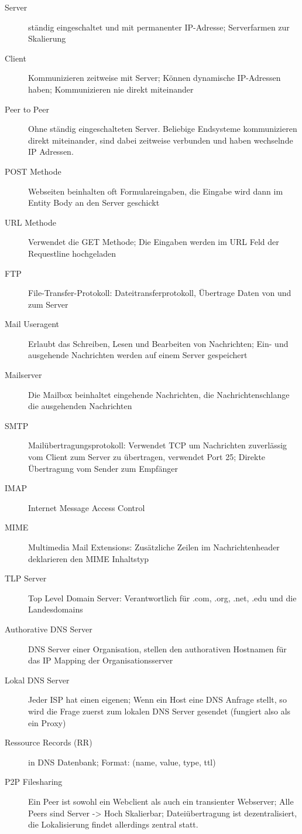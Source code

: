 \documentclass[10pt,landscape]{article}
\begin{document}
\begin{multicols}{3}
\begin{description}
    \item[Server] ständig eingeschaltet und mit permanenter IP-Adresse; Serverfarmen zur Skalierung
    \item[Client] Kommunizieren zeitweise mit Server; Können dynamische IP-Adressen haben; Kommunizieren nie direkt miteinander
    \item[Peer to Peer] Ohne ständig eingeschalteten Server. Beliebige Endsysteme kommunizieren direkt miteinander, sind dabei zeitweise verbunden und haben wechselnde IP Adressen.
    \item[POST Methode] Webseiten beinhalten oft Formulareingaben, die Eingabe wird dann im Entity Body an den Server geschickt
    \item[URL Methode] Verwendet die GET Methode; Die Eingaben werden im URL Feld der Requestline hochgeladen
    \item[FTP] File-Transfer-Protokoll: Dateitransferprotokoll, Übertrage Daten von und zum Server
    \item[Mail Useragent] Erlaubt das Schreiben, Lesen und Bearbeiten von Nachrichten; Ein- und ausgehende Nachrichten werden auf einem Server gespeichert
    \item[Mailserver] Die Mailbox beinhaltet eingehende Nachrichten, die Nachrichtenschlange die ausgehenden Nachrichten
    \item[SMTP] Mailübertragungsprotokoll: Verwendet TCP um Nachrichten zuverlässig vom Client zum Server zu übertragen, verwendet Port 25; Direkte Übertragung vom Sender zum Empfänger 
    \item[IMAP] Internet Message Access Control 
    \item[MIME] Multimedia Mail Extensions: Zusätzliche Zeilen im Nachrichtenheader deklarieren den MIME Inhaltstyp
    \item[TLP Server] Top Level Domain Server: Verantwortlich für .com, .org, .net, .edu und die Landesdomains
    \item[Authorative DNS Server] DNS Server einer Organisation, stellen den authorativen Hostnamen für das IP Mapping der Organisationsserver
    \item[Lokal DNS Server] Jeder ISP hat einen eigenen; Wenn ein Host eine DNS Anfrage stellt, so wird die Frage zuerst zum lokalen DNS Server gesendet (fungiert also als ein Proxy)
    \item[Ressource Records (RR)] in DNS Datenbank; Format: (name, value, type, ttl)
    \item[P2P Filesharing] Ein Peer ist sowohl ein Webclient als auch ein transienter Webserver; Alle Peers sind Server -> Hoch Skalierbar; Dateiübertragung ist dezentralisiert, die Lokalisierung findet allerdings zentral statt.

\end{description}
\end{multicols}
\end{document}

